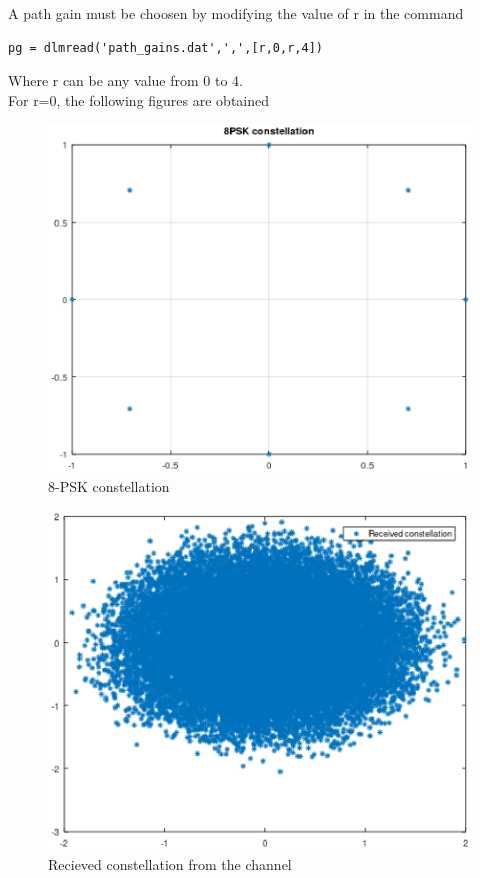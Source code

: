 A path gain must be choosen by modifying the value of r in the command
\begin{lstlisting}
pg = dlmread('path_gains.dat',',',[r,0,r,4])
\end{lstlisting} 
Where r can be any value from 0 to 4.
\\
For r=0, the following figures are obtained
\begin{figure}[!ht]
\centering
\includegraphics[width=\columnwidth]{./LMS_equalizer_octave/figs/psk.eps}
\caption{8-PSK constellation}
\label{fig:psk}
\end{figure}

\begin{figure}[!ht]
\centering
\includegraphics[width=\columnwidth]{./LMS_equalizer_octave/figs/constellation.eps}
\caption{Recieved constellation from the channel}
\label{fig:lms_mse}
\end{figure}

